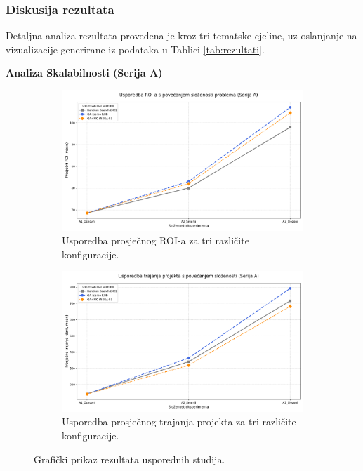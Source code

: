 \subsubsection{Diskusija rezultata}
Detaljna analiza rezultata provedena je kroz tri tematske cjeline, uz oslanjanje na vizualizacije generirane iz podataka u Tablici \ref{tab:rezultati}.

\textbf{Analiza Skalabilnosti (Serija A)}
\begin{figure}[H]
    \centering
    \begin{subfigure}[b]{0.48\textwidth}
        \centering
        \includegraphics[width=\textwidth]{slike/grafikoni_final/A_skalabilnost_roi.png}
        \caption{Usporedba prosječnog ROI-a za tri različite konfiguracije.}
        \label{fig:a_ska_roi}
    \end{subfigure}
    \hfill
    \begin{subfigure}[b]{0.48\textwidth}
        \centering
        \includegraphics[width=\textwidth]{slike/grafikoni_final/A_skalabilnost_trajanje.png}
        \caption{Usporedba prosječnog trajanja projekta za tri različite konfiguracije.}
        \label{fig:a_ska_trajanje}
    \end{subfigure}
    \caption{Grafički prikaz rezultata usporednih  studija.}
    \label{fig:a_skalabilnost}
\end{figure}

